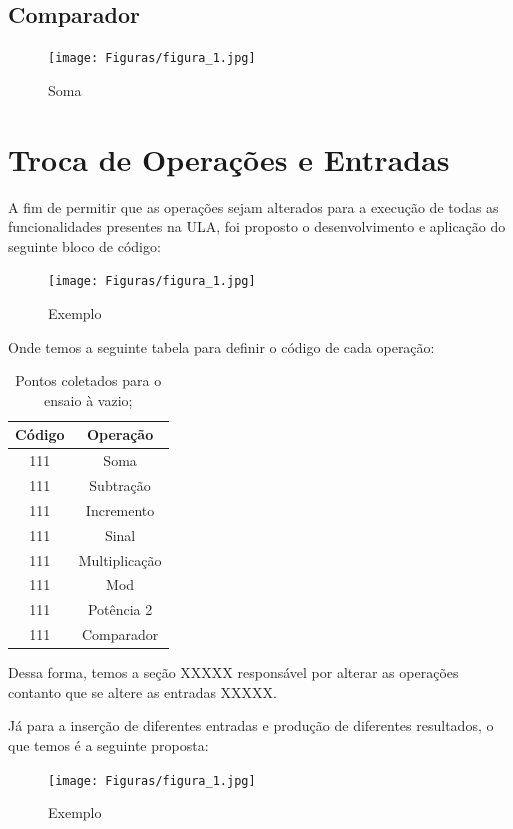 \documentclass[a4paper, 12pt]{article}
\begin{document}
\subsection{Comparador}

\begin{figure}[h]
\caption{Soma}

\centering
\texttt{[image: Figuras/figura\_1.jpg]}
\label{figura:qualquernome}
\end{figure}

\section{Troca de Operações e Entradas}
A fim de permitir que as operações sejam alterados para a execução de todas as funcionalidades presentes na ULA, foi proposto o desenvolvimento e aplicação do seguinte bloco de código:

\begin{figure}[h]
\caption{Exemplo}

\centering
\texttt{[image: Figuras/figura\_1.jpg]}
\label{figura:qualquernome}
\end{figure}

Onde temos a seguinte tabela para definir o código de cada operação:

\begin{table}[htb]
\centering
\begin{tabular}{c|c}
Código & Operação \\ \hline
111	& Soma 		\\\hline
111 & Subtração	\\\hline
111 & Incremento \\\hline
111 & Sinal \\\hline
111 & Multiplicação \\\hline
111 & Mod \\\hline
111 & Potência 2 \\\hline
111 & Comparador
\end{tabular}
\caption{Pontos coletados para o ensaio à vazio;}
\label{vazio}
\end{table}

Dessa forma, temos a seção XXXXX responsável por alterar as operações contanto que se altere as entradas XXXXX.

Já para a inserção de diferentes entradas e produção de diferentes resultados, o que temos é a seguinte proposta:

\begin{figure}[h]
\caption{Exemplo}

\centering
\texttt{[image: Figuras/figura\_1.jpg]}
\label{figura:qualquernome}
\end{figure}
\end{document}
